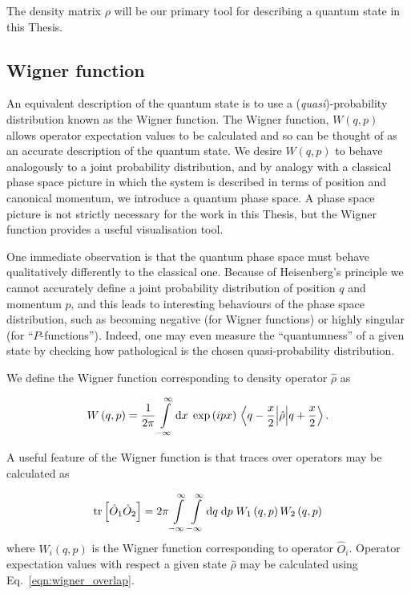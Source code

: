 The density matrix $\rho$ will be our primary tool for describing a quantum state in this Thesis.

\subsection{Wigner function}
An equivalent description of the quantum state is to use a (\emph{quasi})-probability distribution known as the Wigner function. The Wigner function, $W\left(q, p\right)$ allows operator expectation values to be calculated and so can be thought of as an accurate description of the quantum state. We desire $W\left(q, p\right)$ to behave analogously to a joint probability distribution, and by analogy with a classical phase space picture in which the system is described in terms of position and canonical momentum, we introduce a quantum phase space. A phase space picture is not strictly necessary for the work in this Thesis, but the Wigner function provides a useful visualisation tool.

One immediate observation is that the quantum phase space must behave qualitatively differently to the classical one. Because of Heisenberg's principle we cannot accurately define a joint probability distribution of position $q$ and momentum $p$, and this leads to interesting behaviours of the phase space distribution, such as becoming negative (for Wigner functions) or highly singular (for ``$P$-functions''). Indeed, one may even measure the ``quantumness'' of a given state by checking how pathological is the chosen quasi-probability distribution.

We define the Wigner function corresponding to density operator $\hat{\rho}$ as \cite{Leonhardt2010}

\begin{equation}
W\left(q, p\right) = \frac{1}{2 \pi} \int\limits_{-\infty}^{\infty} \mathrm{d}x \; \exp\left(i p x\right) \mel{q - \frac{x}{2}}{\hat{\rho}}{q + \frac{x}{2}}.
\end{equation}


\noindent A useful feature of the Wigner function is that traces over operators may be calculated as

\begin{equation}\label{eqn:wigner_overlap}
\tr\left[\hat{O}_1 \hat{O}_2\right] = 2\pi \int\limits_{-\infty}^\infty \int\limits_{-\infty}^{\infty} \mathrm{d}q \; \mathrm{d}p \; W_1\left(q, p\right) W_2\left(q, p\right)
\end{equation}
where $W_i\left(q, p\right)$ is the Wigner function corresponding to operator $\hat{O}_i$. Operator expectation values with respect a given state $\hat{\rho}$ may be calculated using Eq.~\ref{eqn:wigner_overlap}. 

